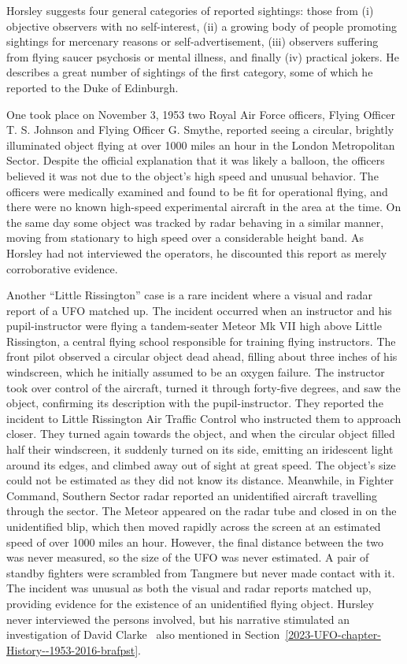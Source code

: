 Horsley suggests four general categories of reported sightings: those from (i) objective observers with no self-interest, (ii) a growing body of people promoting sightings for mercenary reasons or self-advertisement, (iii) observers suffering from flying saucer psychosis or mental illness, and finally (iv) practical jokers.
He describes a great number of sightings of the first category, some of which he reported to the Duke of Edinburgh.


One took place on November 3, 1953 two Royal Air Force officers, Flying Officer T. S. Johnson and Flying Officer G. Smythe,
reported seeing a circular, brightly illuminated object flying at over 1000 miles an hour in the London Metropolitan Sector.
Despite the official explanation that it was likely a balloon,
the officers believed it was not due to the object's high speed and unusual behavior.
The officers were medically examined and found to be fit for operational flying,
and there were no known high-speed experimental aircraft in the area at the time.
On the same day some object was tracked
by radar  behaving in a similar manner, moving from stationary to high
speed over a considerable height band. As Horsley had not interviewed the operators, he
discounted this report as merely corroborative evidence.

Another ``Little Rissington'' case is a rare incident where a visual and radar report of a UFO matched up.
The incident occurred when an instructor and his pupil-instructor were flying a tandem-seater Meteor Mk VII high above Little Rissington,
a central flying school responsible for training flying instructors.
The front pilot observed a circular object dead ahead, filling about three inches of his windscreen,
which he initially assumed to be an oxygen failure.
 The instructor took over control of the aircraft, turned it through forty-five degrees,
and saw the object, confirming its description with the pupil-instructor.
 They reported the incident to Little Rissington Air Traffic Control who instructed them to approach closer.
They turned again towards the object, and when the circular object filled half their windscreen, it suddenly turned on its side,
emitting an iridescent light around its edges, and climbed away out of sight at great speed.
The object's size could not be estimated as they did not know its distance.
Meanwhile, in Fighter Command, Southern Sector radar reported an unidentified aircraft travelling through the sector.
The Meteor appeared on the radar tube and closed in on the unidentified blip, which then moved rapidly across the screen at an estimated speed of over 1000 miles an hour.
However, the final distance between the two was never measured, so the size of the UFO was never estimated.
A pair of standby fighters were scrambled from Tangmere but never made contact with it.
The incident was unusual as both the visual and radar reports matched up, providing evidence for the existence of an unidentified flying object.
Hursley never interviewed the persons involved, but his narrative stimulated an investigation of David Clarke~\cite{Clarke-Mainbrace-2020Dec,Team2022Sep}
also mentioned in Section~\ref{2023-UFO-chapter-History--1953-2016-brafpst}.



